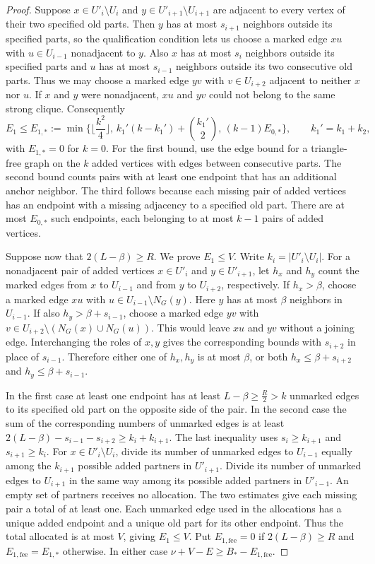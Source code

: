 \documentclass[preprint,11pt,numbers]{elsarticle-arxiv}
\numberwithin{equation}{section}
\theoremstyle{definition}
\begin{document}
\begin{proof}
Suppose $x\in U'_i\setminus U_i$ and $y\in U'_{i+1}\setminus U_{i+1}$
are adjacent to every vertex of their two specified old parts.
Then $y$ has at most $s_{i+1}$ neighbors outside its specified parts,
so the qualification condition lets us choose a marked edge $xu$
with $u\in U_{i-1}$ nonadjacent to $y$. Also $x$ has at most $s_i$
neighbors outside its specified parts and $u$ has at most $s_{i-1}$
neighbors outside its two consecutive old parts. Thus we may choose a
marked edge $yv$ with $v\in U_{i+2}$ adjacent to neither $x$ nor $u$.
If $x$ and $y$ were nonadjacent, $xu$ and $yv$ could not belong to
the same strong clique. Consequently
\[
 E_1\leq E_{1,*}:=\min\{\lfloor \frac{k^2}{4}\rfloor,\,
 k_1' (k-k_1')+\binom{k_1'}{2},\,(k-1)E_{0,*}\},
 \qquad k_1'=k_1+k_2 ,
\]
with $E_{1,*}=0$ for $k=0$. For the first bound, use the edge
bound for a triangle-free graph on the $k$ added vertices with
edges between consecutive parts. The second bound counts pairs
with at least one endpoint that has an additional anchor neighbor.
The third follows because each missing pair of added vertices has
an endpoint with a missing adjacency to a specified old part.
There are at most $E_{0,*}$ such endpoints, each belonging to
at most $k-1$ pairs of added vertices.

Suppose now that $2(L-\beta)\geq R$. We prove $E_1\leq V$.
Write $k_i=|U'_i\setminus U_i|$. For a nonadjacent pair of
added vertices $x\in U'_i$ and $y\in U'_{i+1}$, let $h_x$
and $h_y$ count the marked edges from $x$ to $U_{i-1}$ and
from $y$ to $U_{i+2}$, respectively. If $h_x>\beta$, choose
a marked edge $xu$ with $u\in U_{i-1}\setminus N_G(y)$.
Here $y$ has at most $\beta$ neighbors in $U_{i-1}$. If also
$h_y>\beta+s_{i-1}$, choose a marked edge $yv$ with
$v\in U_{i+2}\setminus(N_G(x)\cup N_G(u))$. This would
leave $xu$ and $yv$ without a joining edge. Interchanging
the roles of $x,y$ gives the corresponding bounds with
$s_{i+2}$ in place of $s_{i-1}$. Therefore either one of $h_x,h_y$
is at most $\beta$, or both $h_x\leq\beta+s_{i+2}$ and
$h_y\leq\beta+s_{i-1}$.

In the first case at least one endpoint has at least
$L-\beta\geq\frac{R}{2}>k$ unmarked edges to its specified old
part on the opposite side of the pair. In the second case the
sum of the corresponding numbers of unmarked edges is at least
$2(L-\beta)-s_{i-1}-s_{i+2}\geq k_i+k_{i+1}$. The last
inequality uses $s_i\geq k_{i+1}$ and $s_{i+1}\geq k_i$.
For $x\in U'_i\setminus U_i$, divide its number of unmarked
edges to $U_{i-1}$ equally among the $k_{i+1}$ possible added
partners in $U'_{i+1}$. Divide its number of unmarked edges
to $U_{i+1}$ in the same way among its possible added
partners in $U'_{i-1}$. An empty set of partners receives
no allocation. The two estimates give each missing pair
a total of at least one. Each unmarked edge used in the
allocations has a unique added endpoint and a unique old
part for its other endpoint. Thus the total allocated is at
most $V$, giving $E_1\leq V$.
Put $E_{1,\mathrm{fee}}=0$ if $2(L-\beta)\geq R$ and
$E_{1,\mathrm{fee}}=E_{1,*}$ otherwise. In either case
$\nu+V-E\geq B_*-E_{1,\mathrm{fee}}$.


\end{proof}
\end{document}

